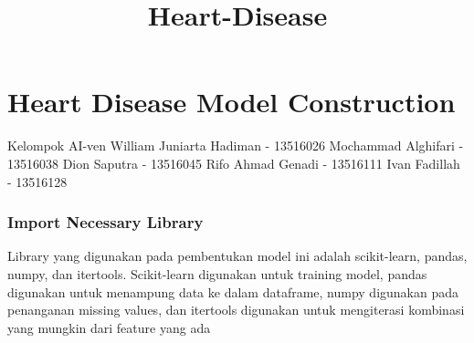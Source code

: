 \documentclass[11pt]{article}
\title{Heart-Disease}
\begin{document}
    
    
    \maketitle
    
    

    
    \section{Heart Disease Model
Construction}\label{heart-disease-model-construction}

Kelompok AI-ven William Juniarta Hadiman - 13516026 Mochammad Alghifari
- 13516038 Dion Saputra - 13516045 Rifo Ahmad Genadi - 13516111 Ivan
Fadillah - 13516128

    \subsubsection{Import Necessary Library}\label{import-necessary-library}

Library yang digunakan pada pembentukan model ini adalah scikit-learn,
pandas, numpy, dan itertools. Scikit-learn digunakan untuk training
model, pandas digunakan untuk menampung data ke dalam dataframe, numpy
digunakan pada penanganan missing values, dan itertools digunakan untuk
mengiterasi kombinasi yang mungkin dari feature yang ada
\end{document}
